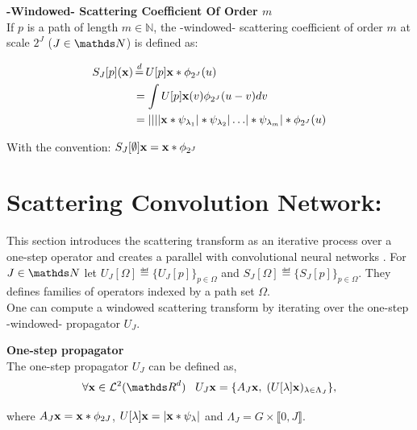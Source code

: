 \documentclass[a4paper,11pt]{report}
\begin{document}
      \begin{defn} \textbf{-Windowed- Scattering Coefficient Of Order $m$}\\
				If $p$ is a path of length $m \in \mathds{N}$, the -windowed- scattering coefficient of order $m$ at scale $2^{J}$ ($J \in \dsN$) is defined as:
				
				\begin{equation}
					\label{eq:ST windowed}
					\begin{split}
						S_{J}[p](\bfx) &\eqdef U[p]\bfx \ast \phi_{2^{J}}(u) \\
									&= \int U[p]\bfx(v) \phi_{2^{J}}(u-v) dv \\
									&= \abs{\abs{\abs{\abs{\bfx \ast \psi_{\lambda_{1}}} \ast \psi_{\lambda_{2}}} 
							\dots } \ast \psi_{\lambda_{m}}} \ast \phi_{2^{J}}(u)
					\end{split}
				\end{equation}
				
				With the convention: $S_{J}[\emptyset]{\bf x} = {\bf x} \ast \phi_{2^{J}}$\\
      	\label{def:SC windozed}
      \end{defn}

		\section{Scattering Convolution Network:}
			\label{sec:ST/SCN}
			
		
			This section introduces the scattering transform as an iterative process over a one-step operator and creates a parallel with convolutional neural networks \cite{lecun2010convolutional}. For $J \in \dsN$ let $U_{J}[\Omega] \eqdef \{U_{J}[p]\}_{p \in \Omega}$ and $S_{J}[\Omega] \eqdef \{S_{J}[p]\}_{p \in \Omega}$. They defines families of operators indexed by a path set $\Omega$.\\
			
			One can compute a windowed scattering transform by iterating over the one-step -windowed- propagator $U_{J}$.
			
			\begin{defn}  \textbf{One-step propagator}\\
				The one-step propagator $U_{J}$ can be defined as,
				\begin{equation}
					\forall \bfx \in \mcalL^{2}(\dsR^{d}) \;\;\; U_{J} \bfx = \{ A_{J}\bfx , \; (U[\lambda]\bfx)_{\lambda \in \Lambda_{J}} \},
					\label{eq:One step propagator}
				\end{equation}
				
				where $A_{J}{\bf x} = {\bf x} \ast \phi_{2J}$, $U[\lambda]{\bf x} = \left| {\bf x} \ast \psi_{\lambda} \right|$ and $\Lambda_{J} = G \times \llbracket0, J \rrbracket$.\\
				\label{def:One step propagator}
			\end{defn}
			
\end{document}
